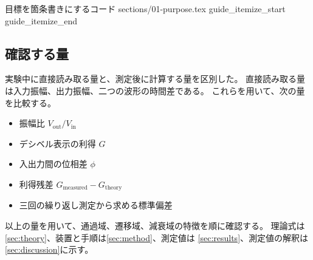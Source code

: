 \SampleGuideSource
  {目標を箇条書きにするコード}
  {sections/01-purpose.tex}
  {guide_itemize_start}
  {guide_itemize_end}




\subsection{確認する量}
\label{subsec:observables}

実験中に直接読み取る量と、測定後に計算する量を区別した。
直接読み取る量は入力振幅、出力振幅、二つの波形の時間差である。
これらを用いて、次の量を比較する。

\begin{itemize}[leftmargin=3.2em,itemsep=0.35em]
  \item 振幅比 $V_{\mathrm{out}}/V_{\mathrm{in}}$
  \item デシベル表示の利得 $G$
  \item 入出力間の位相差 $\phi$
  \item 利得残差 $G_{\mathrm{measured}}-G_{\mathrm{theory}}$
  \item 三回の繰り返し測定から求める標準偏差
\end{itemize}


以上の量を用いて、通過域、遷移域、減衰域の特徴を順に確認する。
理論式は\cref{sec:theory}、装置と手順は\cref{sec:method}、測定値は
\cref{sec:results}、測定値の解釈は\cref{sec:discussion}に示す。


